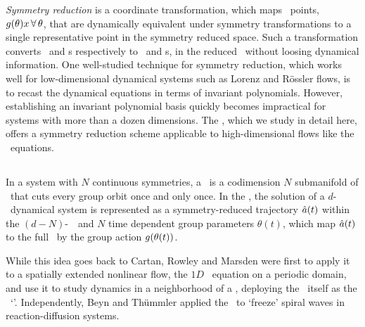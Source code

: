 \emph{Symmetry reduction} is a coordinate transformation, which maps
\statesp\ points, $g (\theta) x \, \forall \, \theta$, that are
dynamically equivalent under symmetry transformations to a single
representative point in the symmetry reduced space. Such a transformation
converts \reqva\ and \rpo s respectively to \eqva\ and \po s, in the
reduced \statesp\ without loosing dynamical information. One well-studied
technique for symmetry reduction, which works well for low-dimensional
dynamical systems such as Lorenz and R\"{o}ssler flows, is to recast the
dynamical equations in terms of invariant polynomials.
However, establishing an invariant polynomial basis quickly becomes
impractical for systems with more than a dozen
dimensions.
The \mslices%
,
which we study in detail here, offers a symmetry reduction
scheme applicable to high-dimensional flows like the \NS\ equations.

\subsection{\Mslices}
\label{s-slice}

In a system with $N$ continuous symmetries, a \emph{\slice} \pSRed\ is a codimension $N$ submanifold
of \pS\ that cuts every group orbit once and only once. In the \emph{\mslices}, the solution
of a $d$-\dmn\ dynamical system is represented as a symmetry-reduced trajectory $\hat{a} (t)$ within the
$(d-N)$-\dmn\ \slice\ and $N$ time dependent group parameters $\theta(t)$, which
map $\hat{a} (t)$ to the full \statesp\ by the group action $g(\theta(t))$.

While this idea goes back to Cartan,
Rowley and Marsden
were first to apply it to a spatially extended nonlinear flow,
the $1D$ \KS\ equation
on a periodic domain, and use it to study dynamics in a neighborhood of
a \reqv, deploying the \reqv\ itself as the \slice\ `\template'.
Independently, Beyn and Th\"{u}mmler applied
the \mslices\ to `freeze' spiral waves in reaction-diffusion systems.

